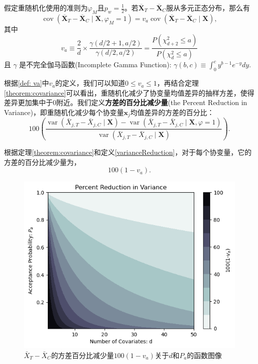 \begin{theorem}\label{theorem:covariance}\cite{morgan2012rerandomization}
    假定重随机化使用的准则为$\varphi_M$且$p_w=\frac{1}{2}$。若$\overline{\mathbf{X}}_T-\overline{\mathbf{X}}_C$服从多元正态分布，那么有
    \begin{equation}
        \operatorname{cov}\left(\overline{\mathbf{X}}_T-\overline{\mathbf{X}}_C \mid \mathbf{X}, \varphi_M=1\right)=v_a \operatorname{cov}\left(\overline{\mathbf{X}}_T-\overline{\mathbf{X}}_C \mid \mathbf{X}\right),
    \end{equation}
    其中
    \begin{equation}\label{def: va}
        v_a \equiv \frac{2}{d} \times \frac{\gamma(d / 2+1, a / 2)}{\gamma(d / 2, a / 2)}=\frac{P\left(\chi_{d+2}^2 \leq a\right)}{P\left(\chi_d^2 \leq a\right)}
    \end{equation}
    且 $\gamma$ 是不完全伽马函数(Incomplete Gamma Function): $\gamma(b, c) \equiv \int_0^c y^{b-1} e^{-y} d y$.
    
\end{theorem}

根据\ref{def: va}中$v_a$的定义，我们可以知道$0\leq v_a\leq 1$，再结合定理\ref{theorem:covariance}可以看出，重随机化减少了协变量均值差异的抽样方差，使得差异更加集中于0附近。我们定义\textbf{方差的百分比减少量}(the Percent Reduction in Variance)，即重随机化减少每个协变量$\mathbf{x}_j$均值差异的方差的百分比：
\begin{equation}\label{varianceReduction}
100\left(\frac{\operatorname{var}\left(\bar{X}_{j, T}-\bar{X}_{j, C} \mid \mathbf{X}\right)-\operatorname{var}\left(\bar{X}_{j, T}-\bar{X}_{j, C} \mid \mathbf{X}, \varphi=1\right)}{\operatorname{var}\left(\bar{X}_{j, T}-\bar{X}_{j, C} \mid \mathbf{X}\right)}\right) .
\end{equation}

根据定理\ref{theorem:covariance}和定义\ref{varianceReduction}，对于每个协变量，它的方差的百分比减少量为，
\begin{equation}
    100(1-v_a).
\end{equation}

\begin{figure}[!htbp]
    \centering
    \includegraphics[width=0.55\linewidth]{figures/100(1-va).png}
    \caption{$\bar{X}_{T}-\bar{X}_{C}$的方差百分比减少量$100(1-v_a)$关于$d$和$P_a$的函数图像}
    \label{fig:100(1-va)}
\end{figure}

